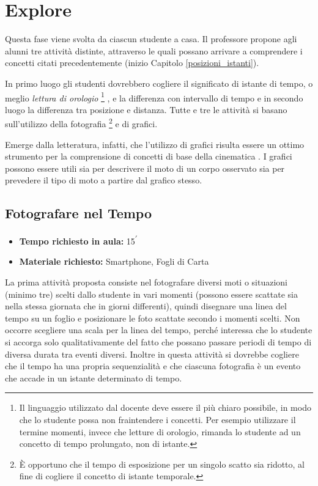 \documentclass{report} \usepackage[T1]{fontenc} \usepackage[italian]{babel}
\begin{document}
\section{Explore}
Questa fase viene svolta da ciascun studente a casa. Il professore propone agli
alunni tre attività distinte, attraverso le quali possano arrivare a
comprendere i concetti citati precedentemente (inizio Capitolo \ref{posizioni_istanti}).

In primo luogo gli
studenti dovrebbero cogliere il significato di istante di tempo, o meglio
\emph{lettura di orologio}\cite{arons1997teaching}
\footnote{
           Il linguaggio utilizzato dal docente deve essere il più chiaro possibile, in modo
           che lo studente possa non fraintendere i concetti. Per esempio utilizzare il
           termine momenti, invece che letture di orologio, rimanda lo studente ad un
           concetto di tempo prolungato, non di istante.
         }
, e la differenza con intervallo
di tempo e in secondo luogo la differenza tra posizione e distanza.
Tutte e tre le attività si basano sull’utilizzo della fotografia
\footnote{
          \`E opportuno che il tempo di esposizione per un singolo scatto sia ridotto, al
            fine di cogliere il concetto di istante temporale.
         }
e di grafici.

Emerge dalla letteratura, infatti, che l’utilizzo di grafici risulta essere un
ottimo strumento per la comprensione di concetti di base della cinematica
\cite{beichner1994testing}. I grafici possono essere
utili sia per descrivere il moto di un corpo osservato sia per prevedere il tipo
di moto a partire dal grafico stesso.

\subsection{Fotografare nel Tempo}

\begin{itemize}
\item \textbf{Tempo richiesto in aula:} 15\textsuperscript{$\prime$}
\item \textbf{Materiale richiesto:} Smartphone, Fogli di Carta
\end{itemize}

La prima attività proposta consiste nel fotografare diversi moti o situazioni
(minimo tre) scelti dallo studente in vari momenti (possono essere scattate sia
nella stessa giornata che in giorni differenti), quindi disegnare una linea del
tempo su un foglio e posizionare le foto scattate secondo i momenti scelti. Non
occorre scegliere una scala per la linea del tempo, perché interessa che lo
studente si accorga solo qualitativamente del fatto che possano passare periodi
di tempo di diversa durata tra eventi diversi. Inoltre in questa attività si
dovrebbe cogliere che il tempo ha una propria sequenzialità e che ciascuna
fotografia è un evento che accade in un istante determinato di tempo.
\end{document}
